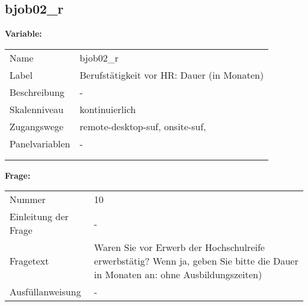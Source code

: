 	
	
	\subsection{bjob02\_r}
	\label{subSection:bjob02_r}

	\noindent\textbf{Variable:}\\
		\begin{tabular}{lL{11.3cm}}
			\label{tableVariable:bjob02_r}
			Name & bjob02\_r \\
			Label & Berufstätigkeit vor HR: Dauer (in Monaten) \\
			Beschreibung & - \\
			Skalenniveau & kontinuierlich \\
			Zugangswege &
				remote-desktop-suf,
				onsite-suf,
 \\
			Panelvariablen & -
			 \\
			 \\
 \\
		\end{tabular}

		\vspace*{1 cm}
		\noindent\textbf{Frage:}\\
		\begin{tabular}{lL{11.3cm}}
			\label{tableQuestion:bjob02_r}
			Nummer & 10 \\
			Einleitung der Frage & - \\
			Fragetext & Waren Sie vor Erwerb der Hochschulreife erwerbstätig?
Wenn ja, geben Sie bitte die Dauer in Monaten an: ohne Ausbildungszeiten) \\
			Ausfüllanweisung & - \\
		\end{tabular}




